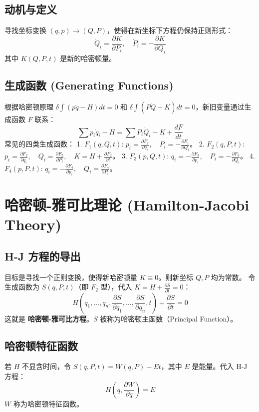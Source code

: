 \documentclass[11pt,a4paper]{article}
\begin{document}
\subsection{动机与定义}
寻找坐标变换 $(q, p) \to (Q, P)$，使得在新坐标下方程仍保持正则形式：
\[ \dot{Q}_i = \frac{\partial K}{\partial P_i}, \quad \dot{P}_i = -\frac{\partial K}{\partial Q_i} \]
其中 $K(Q, P, t)$ 是新的哈密顿量。

\subsection{生成函数 (Generating Functions)}
根据哈密顿原理 $\delta \int (p\dot{q} - H) dt = 0$ 和 $\delta \int (P\dot{Q} - K) dt = 0$，新旧变量通过生成函数 $F$ 联系：
\[ \sum p_i \dot{q}_i - H = \sum P_i \dot{Q}_i - K + \frac{dF}{dt} \]
常见的四类生成函数：
1. $F_1(q, Q, t)$: $p_i = \frac{\partial F_1}{\partial q_i}, \quad P_i = -\frac{\partial F_1}{\partial Q_i}$。
2. $F_2(q, P, t)$: $p_i = \frac{\partial F_2}{\partial q_i}, \quad Q_i = \frac{\partial F_2}{\partial P_i}, \quad K = H + \frac{\partial F_2}{\partial t}$。
3. $F_3(p, Q, t)$: $q_i = -\frac{\partial F_3}{\partial p_i}, \quad P_i = -\frac{\partial F_3}{\partial Q_i}$。
4. $F_4(p, P, t)$: $q_i = -\frac{\partial F_4}{\partial p_i}, \quad Q_i = \frac{\partial F_4}{\partial P_i}$。

\section{哈密顿-雅可比理论 (Hamilton-Jacobi Theory)}

\subsection{H-J 方程的导出}
目标是寻找一个正则变换，使得新哈密顿量 $K \equiv 0$。则新坐标 $Q, P$ 均为常数。
令生成函数为 $S(q, P, t)$（即 $F_2$ 型），代入 $K = H + \frac{\partial S}{\partial t} = 0$：
\[ H\left( q_1, \dots, q_n, \frac{\partial S}{\partial q_1}, \dots, \frac{\partial S}{\partial q_n}, t \right) + \frac{\partial S}{\partial t} = 0 \]
这就是 \textbf{哈密顿-雅可比方程}。$S$ 被称为哈密顿主函数（Principal Function）。

\subsection{哈密顿特征函数}
若 $H$ 不显含时间，令 $S(q, P, t) = W(q, P) - Et$，其中 $E$ 是能量。代入 H-J 方程：
\[ H\left( q, \frac{\partial W}{\partial q} \right) = E \]
$W$ 称为哈密顿特征函数。
\end{document}
